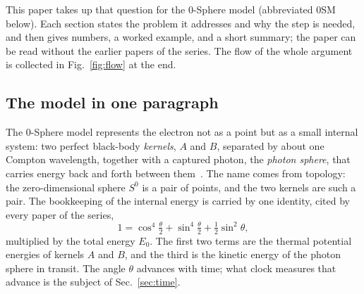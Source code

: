 \documentclass[%
 reprint, amsmath,amssymb, aps, prb, ]{revtex4-2}
\numberwithin{equation}{section}
\begin{document}
This paper takes up that question for the 0-Sphere model (abbreviated 0SM below). Each section states the problem it addresses and why the step is needed, and then gives numbers, a worked example, and a short summary; the paper can be read without the earlier papers of the series. The flow of the whole argument is collected in Fig.~\ref{fig:flow} at the end.

\subsection{The model in one paragraph}

The 0-Sphere model represents the electron not as a point but as a small internal system: two perfect black-body \emph{kernels}, $A$ and $B$, separated by about one Compton wavelength, together with a captured photon, the \emph{photon sphere}, that carries energy back and forth between them~\cite{ref:p1}. The name comes from topology: the zero-dimensional sphere $S^0$ is a pair of points, and the two kernels are such a pair. The bookkeeping of the internal energy is carried by one identity, cited by every paper of the series,
\begin{equation}
1 = \cos^4\!\tfrac{\theta}{2} + \sin^4\!\tfrac{\theta}{2} + \tfrac12\sin^2\theta ,
\label{eq:central}
\end{equation}
multiplied by the total energy $E_0$. The first two terms are the thermal potential energies of kernels $A$ and $B$, and the third is the kinetic energy of the photon sphere in transit. The angle $\theta$ advances with time; what clock measures that advance is the subject of Sec.~\ref{sec:time}.
\end{document}
